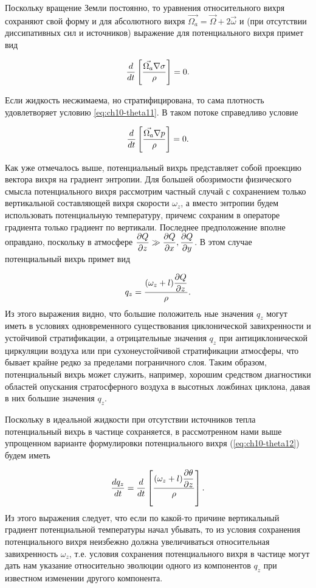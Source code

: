 Поскольку вращение Земли постоянно, то уравнения относительного вихря сохраняют свой форму и для абсолютного вихря $\vec{\Omega_a}=\vec{\Omega}+2\vec{\omega}$ и (при отсутствии диссипативных сил и источников) выражение для потенциального вихря примет вид

\begin{equation*}
    \displaystyle\frac{d }{d t} \displaystyle \left[  \frac{\vec{\Omega_a}\nabla\sigma}{\rho}   \right] = 0.
\end{equation*}

Если жидкость несжимаема, но стратифицирована, то сама плотность удовлетворяет условию \ref{eq:ch10-theta11}. В таком потоке справедливо условие

\begin{equation*}
    \displaystyle\frac{d }{d t} \displaystyle \left[  \frac{\vec{\Omega_a}\nabla p  }{\rho}   \right] = 0.
\end{equation*}

Как уже отмечалось выше, потенциальный вихрь представляет собой проекцию вектора вихря на градиент энтропии. Для большей обозримости физического смысла потенциального вихря рассмотрим частный случай с сохранением только вертикальной составляющей вихря скорости $\omega_z$, а вместо энтропии будем использовать потенциальную температуру, причемс сохраним в операторе градиента только градиент по вертикали. Последнее предположение вполне оправдано, поскольку в атмосфере $\displaystyle\frac{\partial Q}{\partial z}\gg\displaystyle\frac{\partial Q}{\partial x}, \displaystyle\frac{\partial Q}{\partial y}$. В этом случае потенциальный вихрь примет вид

\begin{equation}
    \label{eq:ch10-theta12}
    q_z = \frac{(\omega_z+l)\displaystyle\frac{\partial Q}{\partial z}}{\rho}.
\end{equation}
Из этого выражения видно, что большие положитель ные значения $q_z$ могут иметь в условиях одновременного существования циклонической завихренности и устойчивой стратификации, а отрицательные значения $q_z$ при антициклонической циркуляции воздуха или при сухонеустойчивой стратификации атмосферы, что бывает крайне редко за пределами пограничного слоя. Таким образом, потенциальный вихрь может служить, например, хорошим средством диагностики областей опускания стратосферного воздуха в высотных ложбинах циклона, давая в них большие значения $q_z$.

Поскольку в идеальной жидкости при отсутствии источников тепла потенциальный вихрь в частице сохраняется, в рассмотренном нами выше упрощенном варианте формулировки потенциального вихря (\ref{eq:ch10-theta12}) будем иметь

\begin{equation}
    \label{eq:ch10-theta13}
    \displaystyle\frac{d q_z}{d t} = \displaystyle\frac{d }{d t} \displaystyle \left[  \frac{(\omega_z+l)\displaystyle\frac{\partial \theta}{\partial z} }{\rho}  \right].
\end{equation}
Из этого выражения следует, что если по какой-то причине вертикальный градиент потенциальной температуры начал убывать, то из условия сохранения потенциального вихря неизбежно должна увеличиваться относительная завихренность $\omega_z$, т.е. условия сохранения потенциального вихря в частице могут дать нам указание относительно эволюции одного из компонентов $q_z$ при известном изменении другого компонента.

